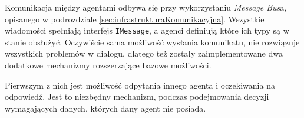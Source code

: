 
\par Komunikacja między agentami odbywa się przy wykorzystaniu \emph{Message Bus}a, opisanego w podrozdziale \ref{sec:infrastrukturaKomunikacyjna}. Wszystkie wiadomości spełniają interfejs \texttt{IMessage}, a agenci definiują które ich typy są w stanie obsłużyć. Oczywiście sama możliwość wysłania komunikatu, nie rozwiązuje wszystkich problemów w dialogu, dlatego też zostały zaimplementowane dwa dodatkowe mechanizmy rozszerzające bazowe możliwości.

\par Pierwszym z nich jest możliwość odpytania innego agenta i oczekiwania na odpowiedź. Jest to niezbędny mechanizm, podczas podejmowania decyzji wymagających danych, których dany agent nie posiada.

